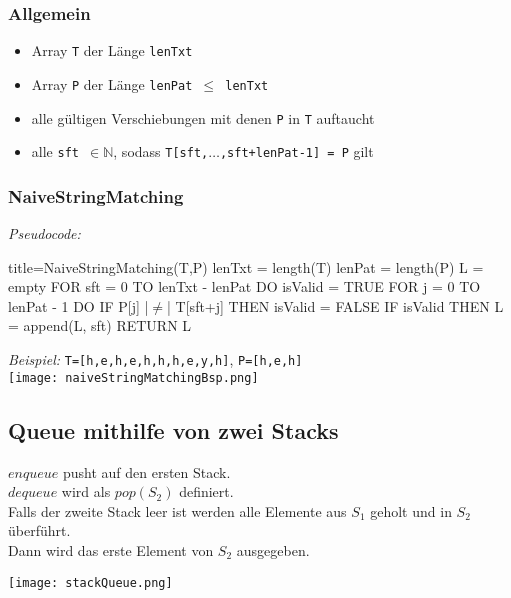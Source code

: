 \subsubsection*{Allgemein}
    \begin{itemize}
        \item {}  Array \texttt{T} der Länge \texttt{lenTxt}
        \item {}  Array \texttt{P} der Länge \texttt{lenPat $\leq$ lenTxt}
        \item {}  alle gültigen Verschiebungen mit denen \texttt{P} in \texttt{T} auftaucht
        \item {} alle \texttt{sft $\in \mathbb{N}$}, sodass \texttt{T[sft,$\dots$,sft+lenPat-1] = P} gilt
    \end{itemize}

\subsubsection*{NaiveStringMatching}
\begin{minipage}{0.45\textwidth}
    \textit{Pseudocode:}
    \begin{ccode}[autogobble,escapeinside=||]{title={NaiveStringMatching(T,P)}}
    lenTxt = length(T)
    lenPat = length(P)
    L = empty
    FOR sft = 0 TO lenTxt - lenPat DO
        isValid = TRUE
        FOR j = 0 TO lenPat - 1 DO
            IF P[j] |$\neq$| T[sft+j] THEN
                isValid = FALSE
        IF isValid THEN
            L = append(L, sft)
    RETURN L
    \end{ccode}
\end{minipage}
\begin{minipage}{0.5\textwidth}
    \textit{Beispiel:} \texttt{T=[h,e,h,e,h,h,h,e,y,h]}, \texttt{P=[h,e,h]} \\
    \texttt{[image: naiveStringMatchingBsp.png]}
\end{minipage}

\subsection*{Queue mithilfe von zwei Stacks}

$enqueue$ pusht auf den ersten Stack. \\
$dequeue$ wird als $pop(S_2)$ definiert. \\
Falls der zweite Stack leer ist werden alle Elemente aus $S_1$ geholt und in $S_2$ überführt. \\
Dann wird das erste Element von $S_2$ ausgegeben. \\
\centerline{\texttt{[image: stackQueue.png]}}

